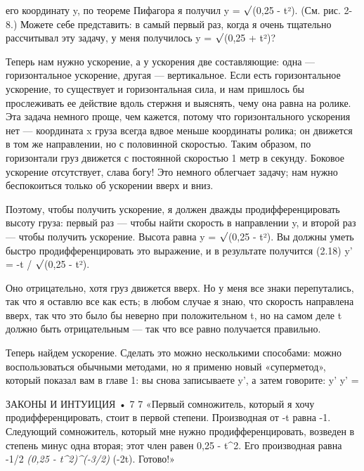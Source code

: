 \documentclass[10pt,oneside]{article}
\begin{document}
его координату y, по теореме Пифагора я получил y = \ensuremath{\sqrt{\vphantom{1}}}(0,25 - t²). (См. рис. 2-8.) Можете себе представить: в самый первый раз, когда я очень тщательно рассчитывал эту задачу, у меня получилось y = \ensuremath{\sqrt{\vphantom{1}}}(0,25 + t²)?\par

Теперь нам нужно ускорение, а у ускорения две составляющие: одна --- горизонтальное ускорение, другая --- вертикальное. Если есть горизонтальное ускорение, то существует и горизонтальная сила, и нам пришлось бы прослеживать ее действие вдоль стержня и выяснять, чему она равна на ролике. Эта задача немного проще, чем кажется, потому что горизонтального ускорения нет --- координата x груза всегда вдвое меньше координаты ролика; он движется в том же направлении, но с половинной скоростью. Таким образом, по горизонтали груз движется с постоянной скоростью 1 метр в секунду. Боковое ускорение отсутствует, слава богу! Это немного облегчает задачу; нам нужно беспокоиться только об ускорении вверх и вниз.\par

Поэтому, чтобы получить ускорение, я должен дважды продифференцировать высоту груза: первый раз --- чтобы найти скорость в направлении y, и второй раз --- чтобы получить ускорение. Высота равна y = \ensuremath{\sqrt{\vphantom{1}}}(0,25 - t²). Вы должны уметь быстро продифференцировать это выражение, и в результате получится (2.18) y' = -t / \ensuremath{\sqrt{\vphantom{1}}}(0,25 - t²).\par

Оно отрицательно, хотя груз движется вверх. Но у меня все знаки перепутались, так что я оставлю все как есть; в любом случае я знаю, что скорость направлена вверх, так что это было бы неверно при положительном t, но на самом деле t должно быть отрицательным --- так что все равно получается правильно.\par

Теперь найдем ускорение. Сделать это можно несколькими способами: можно воспользоваться обычными методами, но я применю новый «суперметод», который показал вам в главе 1: вы снова записываете y', а затем говорите: y' y' =\par

ЗАКОНЫ И ИНТУИЦИЯ • 7 7 «Первый сомножитель, который я хочу продифференцировать, стоит в первой степени. Производная от -t равна -1. Следующий сомножитель, который мне нужно продифференцировать, возведен в степень минус одна вторая; этот член равен 0,25 - t\textasciicircum{}2. Его производная равна -1/2 \emph{ (0,25 - t\textasciicircum{}2)\textasciicircum{}(-3/2) } (-2t). Готово!»\par
\end{document}
